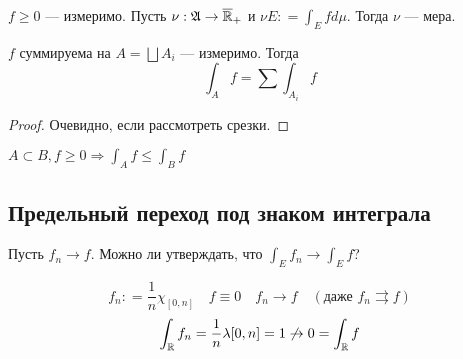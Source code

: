 \begin{corollary}
    \(f \geq 0\) --- измеримо. Пусть \(\nu : \mathfrak{A} \to \overline {\mathbb{R}}_{ +}\) и \(\nu E : = \int_E f d\mu\). Тогда \(\nu\) --- мера.
\end{corollary}

\begin{corollary}
    \(f\) суммируема на \(A = \bigsqcup A_i\) --- измеримо. Тогда
    \[\int_A f = \sum \int_{A_i} f\]
\end{corollary}
\begin{proof}
    Очевидно, если рассмотреть срезки.
\end{proof}
\begin{corollary}
    \(A\subset B, f \geq 0 \Rightarrow \int_A f \leq \int_B f\)
\end{corollary}

\subsection*{Предельный переход под знаком интеграла}

Пусть \(f_n \to f\). Можно ли утверждать, что \(\int_E f_n \to \int_E f\)?

\begin{example}[контр]
    \[f_n : = \frac{1}{n} \chi_{[0, n]} \quad f \equiv 0 \quad f_n \to f \quad (\text{даже } f_n \rightrightarrows f)\]
    \[\int_{\mathbb{R}} f_n = \frac{1}{n}\lambda[0, n] = 1 \not\to 0 = \int_{\mathbb{R}} f\]
\end{example}

